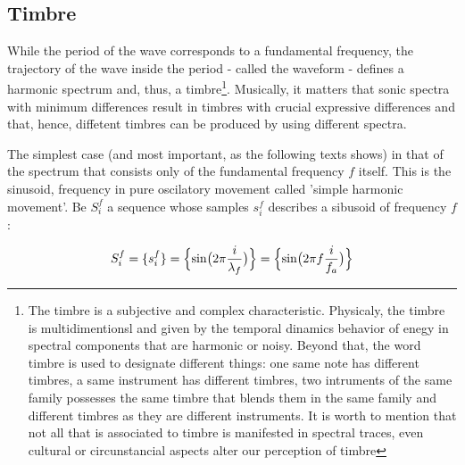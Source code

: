 \documentclass[
 aip,
 jmp,
 amsmath,amssymb,
 reprint,
]{revtex4-1}
\begin{document}
\subsection{Timbre}
While the period of the wave corresponds to a fundamental frequency, the trajectory of the wave inside the period - called the waveform - defines a harmonic spectrum and, thus, a timbre\footnote{The timbre is a subjective and complex characteristic. Physicaly, the timbre is multidimentionsl and given by the temporal dinamics behavior of enegy in spectral components that are harmonic or noisy. Beyond that, the word timbre is used to designate different things: one same note has different timbres, a same instrument has different timbres, two intruments of the same family possesses the same timbre that blends them in the same family and different timbres as they are different instruments. It is worth to mention that not all that is associated to timbre is manifested in spectral traces, even cultural or circunstancial aspects alter our perception of timbre}. Musically, it matters that sonic spectra with minimum differences result in timbres with crucial expressive differences and that, hence, diffetent timbres can be produced by using different spectra\cite{Roederer}.

The simplest case (and most important, as the following texts shows) in that of the spectrum that consists only of the fundamental frequency $f$ itself. This is the sinusoid, frequency in pure oscilatory movement called 'simple harmonic movement'. Be $S_i^f$ a sequence whose samples $s_i^f$ describes a sibusoid of frequency $f$:

\begin{equation}\label{senoide}
     S^f_i=\{ s^f_i \}=\Bigl\{ \sin\bigl(2\pi \frac{i}{\lambda_f} \bigr)  \Bigr\} = \Bigl\{ \sin\bigl(2\pi f \frac{i}{f_a}\bigr)  \Bigr\} 
\end{equation}

\nocite{*}

\end{document}
